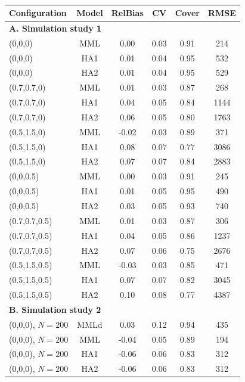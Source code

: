 \documentclass[12pt,fleqn]{article}
\begin{document}
\pagebreak



\begin{table}[ht]
\caption{
}
\label{tab:sims}
\raggedright
\begin{tabular}{lccccc}
  \hline
   Configuration & Model & RelBias & CV & Cover & RMSE \\
  \hline
   \multicolumn{6}{l}{\textbf{A. Simulation study 1}}   \\
  \hline
  (0,0,0) & MML & 0.00 & 0.03 & 0.91 & 214 \\
  (0,0,0) & HA1 & 0.01 & 0.04 & 0.95 & 532 \\
  (0,0,0) & HA2 & 0.01 & 0.04 & 0.95 & 529 \\
  (0.7,0.7,0) & MML & 0.01 & 0.03 & 0.87 & 268 \\
  (0.7,0.7,0) & HA1 & 0.04 & 0.05 & 0.84 & 1144 \\
  (0.7,0.7,0) & HA2 & 0.06 & 0.05 & 0.80 & 1763 \\
  (0.5,1.5,0) & MML & -0.02 & 0.03 & 0.89 & 371 \\
  (0.5,1.5,0) & HA1 & 0.08 & 0.07 & 0.77 & 3086\\
  (0.5,1.5,0) & HA2 & 0.07 & 0.07 & 0.84 & 2883 \\
  (0,0,0.5) & MML & 0.00 & 0.03 & 0.91 & 245 \\
  (0,0,0.5) & HA1 & 0.01 & 0.05 & 0.95 & 490 \\
  (0,0,0.5) & HA2 & 0.03 & 0.05 & 0.93 & 740 \\
  (0.7,0.7,0.5) & MML & 0.01 & 0.03 & 0.87 & 306 \\
  (0.7,0.7,0.5) & HA1 & 0.04 & 0.05 & 0.86 & 1237 \\
  (0.7,0.7,0.5) & HA2 & 0.07 & 0.06 & 0.75 & 2676 \\
  (0.5,1.5,0.5) & MML & -0.03 & 0.03 & 0.85 & 471  \\
  (0.5,1.5,0.5) & HA1 & 0.07 & 0.07 & 0.82 & 3045 \\
  (0.5,1.5,0.5) & HA2 & 0.10 & 0.08 & 0.77 & 4387 \\
  \hline
    \multicolumn{6}{l}{\textbf{B. Simulation study 2}}   \\
  \hline
  (0,0,0), $N=200$ & MMLd & 0.03 & 0.12 & 0.94 & 435 \\
  (0,0,0), $N=200$ & MML & -0.04 & 0.05 & 0.89 & 194 \\
  (0,0,0), $N=200$ & HA1 & -0.06 & 0.06 & 0.83 & 312 \\
  (0,0,0), $N=200$ & HA2 & -0.06 & 0.06 & 0.83 & 312 \\

\end{tabular}
\end{table}
\end{document}
